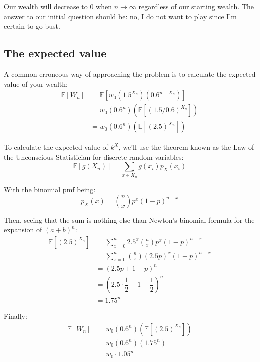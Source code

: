 \documentclass[12pt]{article}
\begin{document}
Our wealth will decrease to 0 when $n\to\infty$ regardless of our starting wealth. The answer to our initial question should be: no, I do not want to play since I'm certain to go bust.

\subsection{The expected value}
A common erroneous way of approaching the problem is to calculate the expected value of your wealth:
\begin{equation*}
  \begin{split}
    \mathbb{E}[W_n] &= \mathbb{E}[w_0 \left(1.5^{X_n}\right) \left(0.6^{n-X_n}\right)]\\
    & = w_0  \left(0.6^n\right) \left(\mathbb{E}[(1.5/0.6)^{X_n}]\right)\\
    & = w_0 \left(0.6^n\right) \left(\mathbb{E}[(2.5)^{X_n}]\right)
  \end{split}
\end{equation*}

To calculate the expected value of $k^X$, we'll use the theorem known as the Law of the Unconscious Statistician for discrete random variables:
\begin{equation}
    \mathbb{E}[g(X_n)] = \sum\limits_{x \in X_n} g(x_i) p_X(x_i)
\end{equation}

With the binomial pmf being:
\begin{equation}
    p_X(x) = {n \choose x} p^x (1-p)^{n-x}
\end{equation}

Then, seeing that the sum is nothing else than Newton's binomial formula for the expansion of $(a+b)^n$:
\begin{equation*}
  \begin{split}
    \mathbb{E}[(2.5)^{X_n}] &= \sum\limits_{x=0}^{n} 2.5^x {n \choose x} p^x (1-p)^{n-x}\\
    &= \sum\limits_{x=0}^{n} {n \choose x} (2.5p)^x (1-p)^{n-x}\\
    &= (2.5p + 1 - p)^n \\ 
    &= (2.5 \cdot \dfrac{1}{2} + 1 - \dfrac{1}{2})^n\\
    & = 1.75^n
  \end{split}
\end{equation*}

Finally:
\begin{equation*}
  \begin{split}
    \mathbb{E}[W_n] &= w_0 \left(0.6^n\right) \left(\mathbb{E}[(2.5)^{X_n}]\right)\\
    &= w_0 \left(0.6^n\right) \left(1.75^n\right)\\
    &= w_0 \cdot 1.05^n
  \end{split}
\end{equation*}
\end{document}
